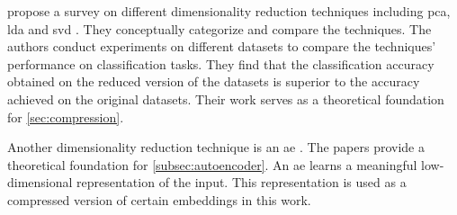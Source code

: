 \citeauthor{dim_reduction2021} propose a survey on different dimensionality reduction techniques including \acs*{pca}, \acs*{lda} and \acs*{svd} \cite{dim_reduction2021}.
They conceptually categorize and compare the techniques.
The authors conduct experiments on different datasets to compare the techniques' performance on classification tasks.
They find that the classification accuracy 
obtained on the reduced version of the datasets is superior to 
the accuracy achieved on the original datasets.
Their work serves as a theoretical foundation for \autoref{sec:compression}.

Another dimensionality reduction technique is an \acs*{ae} \cite{autoencoder2020, autoencoder2021}.
The papers provide a theoretical foundation for \autoref{subsec:autoencoder}.
An \acs*{ae} learns a meaningful low-dimensional representation of the input.
This representation is used as a compressed version of certain embeddings in this work.